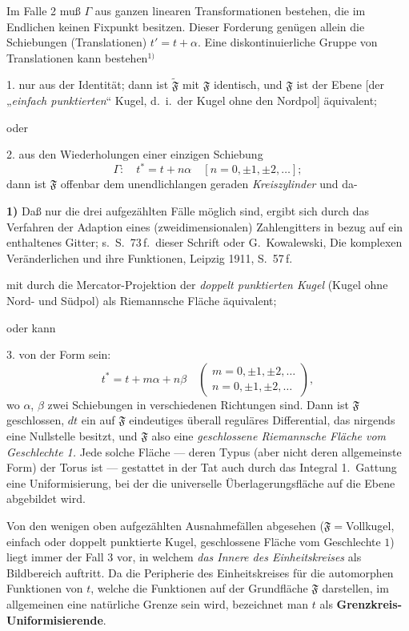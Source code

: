 \documentclass{article}
\begin{document}
Im Falle 2 muß $\varGamma$ aus ganzen linearen Transformationen bestehen, die im Endlichen keinen Fixpunkt besitzen. Dieser Forderung genügen allein die Schiebungen (Translationen) $t' = t + \alpha$. Eine diskontinuierliche Gruppe von Translationen kann bestehen${}^{1)}$

1. nur aus der Identität; dann ist $\widetilde{\mathfrak{F}}$ mit $\mathfrak{F}$ identisch, und $\mathfrak{F}$ ist der Ebene [der „\emph{einfach punktierten}“ Kugel, d.~i.\ der Kugel ohne den Nordpol] äquivalent;

oder

2. aus den Wiederholungen einer einzigen Schiebung
\[ \varGamma\colon \quad t^* = t + n\alpha \quad [n = 0, \pm 1, \pm 2, \dots]; \]
dann ist $\mathfrak{F}$ offenbar dem unendlichlangen geraden \emph{Kreiszylinder} und da-

\textbf{1)} Daß nur die drei aufgezählten Fälle möglich sind, ergibt sich durch das Verfahren der Adaption eines (zweidimensionalen) Zahlengitters in bezug auf ein enthaltenes Gitter; s.\ S.~73\,f.\ dieser Schrift oder G.~Kowalewski, Die komplexen Veränderlichen und ihre Funktionen, Leipzig 1911, S.~57\,f.

mit durch die Mercator-Projektion der \emph{doppelt punktierten Kugel} (Kugel ohne Nord- und Südpol) als Riemannsche Fläche äquivalent;

oder kann

3. von der Form sein:
\[ t^* = t + m\alpha + n\beta \quad \begin{pmatrix} m = 0, \pm 1, \pm 2, \dots \\ n = 0, \pm 1, \pm 2, \dots \end{pmatrix}, \]
wo $\alpha$, $\beta$ zwei Schiebungen in verschiedenen Richtungen sind. Dann ist $\mathfrak{F}$ geschlossen, $dt$ ein auf $\mathfrak{F}$ eindeutiges überall reguläres Differential, das nirgends eine Nullstelle besitzt, und $\mathfrak{F}$ also eine \emph{geschlossene Riemannsche Fläche vom Geschlechte 1.} Jede solche Fläche --- deren Typus (aber nicht deren allgemeinste Form) der Torus ist --- gestattet in der Tat auch durch das Integral 1.~Gattung eine Uniformisierung, bei der die universelle Überlagerungsfläche auf die Ebene abgebildet wird.

Von den wenigen oben aufgezählten Ausnahmefällen abgesehen ($\mathfrak{F} = {}$Vollkugel, einfach oder doppelt punktierte Kugel, geschlossene Fläche vom Geschlechte $1$) liegt immer der Fall 3 vor, in welchem \emph{das Innere des Einheitskreises} als Bildbereich auftritt. Da die Peripherie des Einheitskreises für die automorphen Funktionen von $t$, welche die Funktionen auf der Grundfläche $\mathfrak{F}$ darstellen, im allgemeinen eine natürliche Grenze sein wird, bezeichnet man $t$ als \textbf{Grenzkreis-Uniformisierende}.
\end{document}
